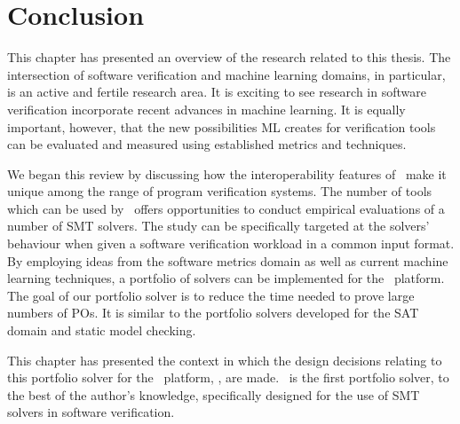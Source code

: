 \section{Conclusion}

This chapter has presented an overview of the research related to this thesis. 
The intersection of software verification and machine learning domains, in particular, is an active and fertile research area. 
It is exciting to see research in software verification incorporate recent advances in machine learning. 
It is equally important, however, that the new possibilities ML creates for verification tools can be evaluated and measured using established metrics and techniques. 

We began this review by discussing how the interoperability features of \why~make it unique among the range of program verification systems.
The number of tools which can be used by \why~offers opportunities to conduct empirical evaluations of a number of SMT solvers.
The study can be specifically targeted at the solvers' behaviour when given a software verification workload in a common input format.
By employing ideas from the software metrics domain as well as current machine learning techniques, a portfolio of solvers can be implemented for the \why~platform.
The goal of our portfolio solver is to reduce the time needed to prove large numbers of POs.
It is similar to the portfolio solvers developed for the SAT domain and static model checking.

This chapter has presented the context in which the design decisions relating to this portfolio solver for the \why~platform, \where, are made. 
\where~is the first portfolio solver, to the best of the author's knowledge, specifically designed for the use of SMT solvers in software verification.    



   
